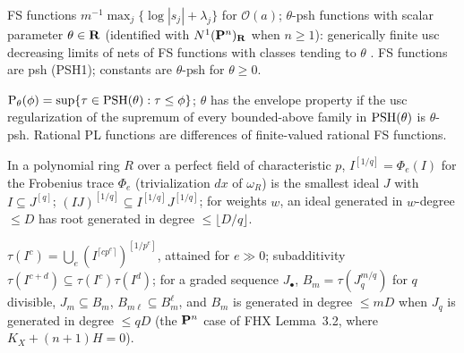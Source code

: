 \begin{definition}\label{def:pn-psh}
\leanok
{}
FS functions $m^{-1}\max_j\{\log|s_j|+\lambda_j\}$ for $\mathcal O(a)$; $\theta$-psh functions
with scalar parameter $\theta\in\mathbf{R}$ (identified with $N^1(\mathbf{P}^n)_{\mathbf{R}}$ when $n\ge1$):
generically finite usc decreasing limits of nets of FS functions with
classes tending to $\theta$ \cite[Definition~4.1]{BJ22}. FS functions are psh (PSH1); constants are
$\theta$-psh for $\theta\ge0$.
\end{definition}

\begin{definition}\label{def:pn-ep}
\leanok
{}
$\mathrm P_\theta(\phi)=\sup\{\tau\in\operatorname{PSH}(\theta):\tau\le\phi\}$; $\theta$ has the envelope property if the
usc regularization of the supremum of every bounded-above family in $\operatorname{PSH}(\theta)$ is $\theta$-psh.
Rational PL functions are differences of finite-valued rational FS functions.
\end{definition}

\begin{lemma}\label{lem:frobenius-roots}
\leanok
In a polynomial ring $R$ over a perfect field of characteristic $p$, $I^{[1/q]}=\Phi_e(I)$ for the
Frobenius trace $\Phi_e$ (trivialization $dx$ of $\omega_R$) is the smallest ideal $J$ with
$I\subseteq J^{[q]}$; $(IJ)^{[1/q]}\subseteq I^{[1/q]}J^{[1/q]}$; for weights $w$, an ideal generated in
$w$-degree $\le D$ has root generated in degree $\le\lfloor D/q\rfloor$.
\end{lemma}

\begin{lemma}\label{lem:test-ideals}
\leanok
{}
$\tau(I^c)=\bigcup_e(I^{\lceil cp^e\rceil})^{[1/p^e]}$, attained for $e\gg0$; subadditivity
$\tau(I^{c+d})\subseteq\tau(I^c)\tau(I^d)$; for a graded sequence $J_\bullet$, $B_m=\tau(J_q^{m/q})$ for $q$
divisible, $J_m\subseteq B_m$, $B_{m\ell}\subseteq B_m^\ell$, and $B_m$ is generated in degree $\le mD$ when
$J_q$ is generated in degree $\le qD$ (the $\mathbf{P}^n$ case of FHX Lemma~3.2, where $K_X+(n+1)H=0$).
\end{lemma}

